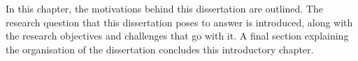 In this chapter, the motivations behind this dissertation are outlined. The research question that this dissertation poses to answer is introduced, along with the research objectives and challenges that go with it. A final section explaining the organisation of the dissertation concludes this introductory chapter.